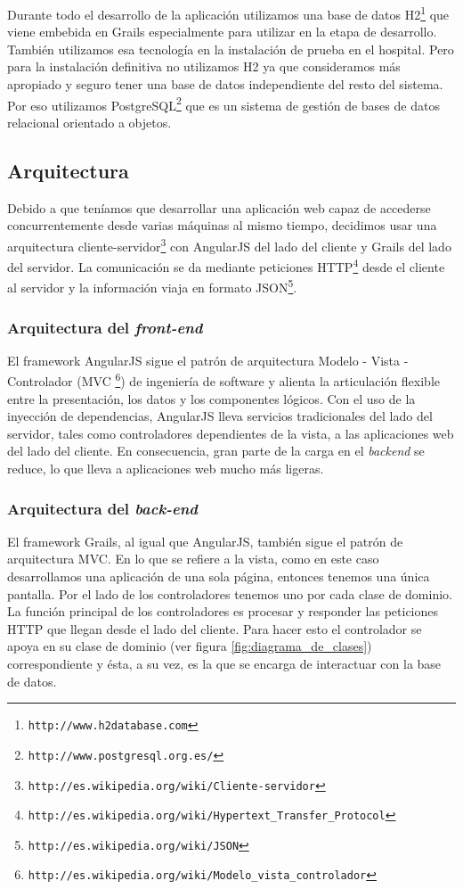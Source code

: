 Durante todo el desarrollo de la aplicación utilizamos una base de datos H2\footnote{\texttt{http://www.h2database.com}} que viene embebida en Grails especialmente para utilizar en la etapa de desarrollo. También utilizamos esa tecnología en la instalación de prueba en el hospital. Pero para la instalación definitiva no utilizamos H2 ya que consideramos más apropiado y seguro tener una base de datos independiente del resto del sistema. Por eso utilizamos PostgreSQL\footnote{\texttt{http://www.postgresql.org.es/}} que es un sistema de gestión de bases de datos relacional orientado a objetos.


\subsection{Arquitectura}
Debido a que teníamos que desarrollar una aplicación web capaz de accederse concurrentemente desde varias máquinas al mismo tiempo, decidimos usar una arquitectura cliente-servidor\footnote{\texttt{http://es.wikipedia.org/wiki/Cliente-servidor}} con AngularJS del lado del cliente y Grails del lado del servidor. La comunicación se da mediante peticiones HTTP\footnote{\texttt{http://es.wikipedia.org/wiki/Hypertext\_Transfer\_Protocol}} desde el cliente al servidor y la información viaja en formato JSON\footnote{\texttt{http://es.wikipedia.org/wiki/JSON}}.


\subsubsection{Arquitectura del \textit{front-end}}
El framework AngularJS sigue el patrón de arquitectura Modelo - Vista - Controlador (MVC  \footnote{\texttt{http://es.wikipedia.org/wiki/Modelo\_vista\_controlador}}) de ingeniería de software y alienta la articulación flexible entre la presentación, los datos y los componentes lógicos. Con el uso de la inyección de dependencias, AngularJS lleva servicios tradicionales del lado del servidor, tales como controladores dependientes de la vista, a las aplicaciones web del lado del cliente. En consecuencia, gran parte de la carga en el \textit{backend} se reduce, lo que lleva a aplicaciones web mucho más ligeras.

\subsubsection{Arquitectura del \textit{back-end}}
El framework Grails, al igual que AngularJS, también sigue el patrón de arquitectura MVC. En lo que se refiere a la vista, como en este caso desarrollamos una aplicación de una sola página, entonces tenemos una única pantalla. Por el lado de los controladores tenemos uno por cada clase de dominio. La función principal de los controladores es procesar y responder las peticiones HTTP que llegan desde el lado del cliente. Para hacer esto el controlador se apoya en su clase de dominio (ver figura \ref{fig:diagrama_de_clases}) correspondiente y ésta, a su vez, es la que se encarga de interactuar con la base de datos.

